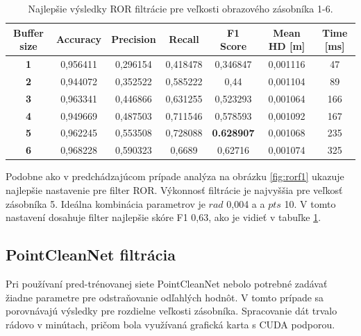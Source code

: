 \begin{table}[h]
	\centering
	\caption{\label{tab:ror_best} Najlepšie výsledky ROR filtrácie pre veľkosti obrazového zásobníka 1-6. }
	\begin{tabular}{ccccccc}
		\toprule
		\textbf{Buffer size} & \textbf{Accuracy} & \textbf{Precision} & \textbf{Recall} & \textbf{F1 Score} & \textbf{Mean HD [m]} & \textbf{Time [ms]} \\ 
		\midrule
		\textbf{1}           & 0,956411          & 0,296154           & 0,418478        & 0,346847          & 0,001116          & 47            \\ 
		\textbf{2}           & 0,944072          & 0,352522           & 0,585222        & 0,44              & 0,001104          & 89            \\ 
		\textbf{3}           & 0,963341          & 0,446866           & 0,631255        & 0,523293          & 0,001064          & 166           \\
		\textbf{4}           & 0,949669          & 0,487503           & 0,711546        & 0,578593          & 0,001092          & 167           \\ 
		\textbf{5}           & 0,962245          & 0,553508           & 0,728088        & \textbf{0.628907}          & 0,001068 & 235           \\ 
		\textbf{6}           & 0,968228          & 0,590323           & 0,6689          & 0,62716           & 0,001074          & 325           \\ 
		\bottomrule
	\end{tabular}
\end{table}

Podobne ako v predchádzajúcom prípade analýza na obrázku \ref{fig:rorf1} ukazuje najlepšie nastavenie pre filter ROR. Výkonnosť filtrácie je najvyššia pre veľkosť zásobníka 5. Ideálna kombinácia parametrov je $rad$ 0,004 a a $pts$ 10. V tomto nastavení dosahuje filter najlepšie skóre F1 0,63, ako je vidieť v tabuľke \ref{tab:ror_best}.

\subsection{PointCleanNet filtrácia}
Pri používaní pred-trénovanej siete PointCleanNet nebolo potrebné zadávať žiadne parametre pre odstraňovanie odľahlých hodnôt. V tomto prípade sa porovnávajú výsledky pre rozdielne veľkosti zásobníka. Spracovanie dát trvalo rádovo v minútach, pričom bola využívaná grafická karta s CUDA podporou.

